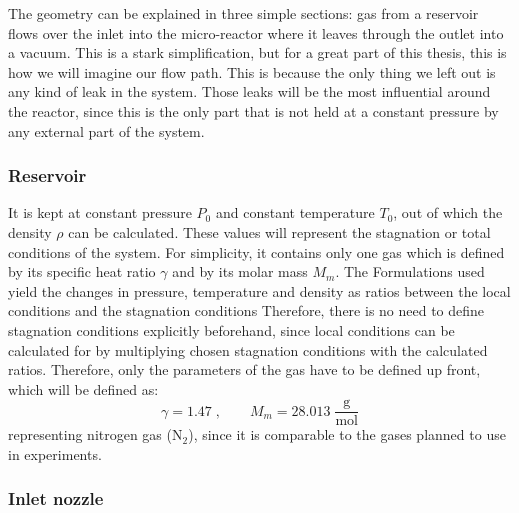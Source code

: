 	The geometry can be explained in three simple sections: gas from a reservoir flows over the inlet into the micro-reactor where it leaves through the outlet into a vacuum. 
	This is a stark simplification, but for a great part of this thesis, this is how we will imagine our flow path.
	This is because the only thing we left out is any kind of leak in the system.
	Those leaks will be the most influential around the reactor, since this is the only part that is not held at a constant pressure by any external part of the system.\\
\subsubsection*{Reservoir}

	It is kept at constant pressure $P_0$ and constant temperature $T_0$, out of which the density $\rho$ can be calculated.
	These values will represent the stagnation or total conditions of the system.
	For simplicity, it contains only one gas which is defined by its specific heat ratio $\gamma$ and by its molar mass $M_m$.
	The Formulations used yield the changes in pressure, temperature and density as ratios between the local conditions and the stagnation conditions
	Therefore, there is no need to define stagnation conditions explicitly beforehand, since local conditions can be calculated for by multiplying chosen stagnation conditions with the calculated ratios.
	Therefore, only the parameters of the gas have to be defined up front, which will be defined as:
	$$
		\gamma = 1.47\;, \qquad M_m = 28.013\; \frac{\text{g}}{\text{mol}}
	$$
	representing nitrogen gas ($\text{N}_2$), since it is comparable to the gases planned to use in experiments.
\subsubsection*{Inlet nozzle}

